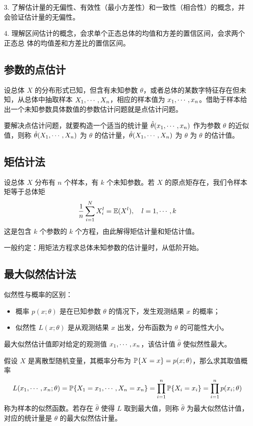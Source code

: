 3. 了解估计量的无偏性、有效性（最小方差性）和一致性（相合性）的概念，并会验证估计量的无偏性。

4. 理解区间估计的概念，会求单个正态总体的均值和方差的置信区间，会求两个正态总
体的均值差和方差比的置信区间。

\subsection{参数的点估计}

设总体 $X$ 的分布形式已知，但含有未知参数 $\theta$，或者总体的某数字特征存在但未知，从总体中抽取样本 $X_1,\cdots,X_n$，相应的样本值为 $x_1,\cdots,x_n$。借助于样本给出一个未知参数具体数值的参数估计问题就是点估计问题。

要解决点估计问题，就要构造一个适当的统计量 $\hat{\theta}(x_1,\cdots,x_n)$ 作为参数 $\theta$ 的近似值，则称 $\hat{\theta}(X_1,\cdots,X_n)$ 为 $\theta$ 的估计量，$\hat{\theta}(X_1,\cdots,X_n)$ 为 $\theta$ 为 $\theta$ 的估计值。

\subsection{矩估计法}

设总体 $X$ 分布有 $n$ 个样本，有 $k$ 个未知参数。若 $X$ 的原点矩存在，我们令样本矩等于总体矩
\[ \frac{1}{n} \sum_{i=1}^{N} X_i^l = \mathbb{E}(X^l), \quad l = 1, \cdots, k \]
这是包含 $k$ 个参数的 $k$ 个方程，由此解得矩估计量和矩估计值。

一般约定：用矩法方程求总体未知参数的估计量时，从低阶开始。

\subsection{最大似然估计法}

似然性与概率的区别：
\begin{itemize}
	\item 概率 $p(x;\theta)$ 是在已知参数 $\theta$ 的情况下，发生观测结果 $x$ 的概率；
	\item 似然性 $L(x; \theta)$ 是从观测结果 $x$ 出发，分布函数为 $\theta$ 的可能性大小。
\end{itemize}

最大似然估计值即对给定的观测值 $x_1,\cdots,x_n$，该估计值 $\hat{\theta}$ 使似然性最大。

假设 $X$ 是离散型随机变量，其概率分布为 $\mathbb{P}\{X = x\} = p(x; \theta)$，那么求其取值概率
\[ L(x_1,\cdots,x_n;\theta) = \mathbb{P}\{X_1 = x_1, \cdots, X_n = x_n\} = \prod_{i=1}^n \mathbb{P}\{X_i=x_i\} = \prod_{i=1}^n p(x_i; \theta) \]
称为样本的似然函数。若存在 $\hat{\theta}$ 使得 $L$ 取到最大值，则称 $\hat{\theta}$ 为最大似然估计值，对应的统计量是 $\theta$ 的最大似然估计量。

